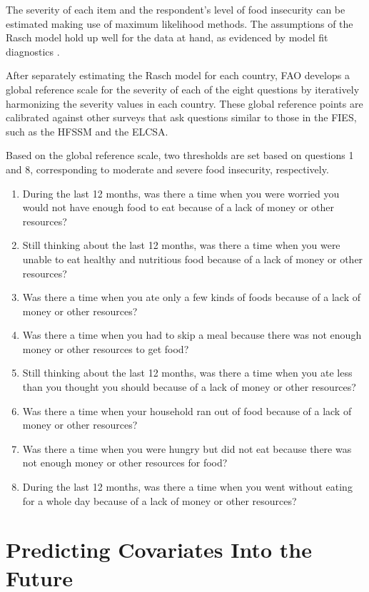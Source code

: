 \documentclass{article}
\begin{document}
The severity of each item and the respondent’s level of food insecurity can be estimated making use of maximum likelihood methods. The assumptions of the Rasch model hold up well for the data at hand, as evidenced by model fit diagnostics \cite{Cafiero2018}.

After separately estimating the Rasch model for each country, FAO develops a global reference scale for the severity of each of the eight questions by iteratively harmonizing the severity values in each country. These global reference points are calibrated against other surveys that ask questions similar to those in the FIES, such as the HFSSM and the ELCSA.

Based on the global reference scale, two thresholds are set based on questions 1 and 8, corresponding to moderate and severe food insecurity, respectively.


\begin{enumerate}
	\item During the last 12 months, was there a time when you were worried you would not have enough food to eat because of a lack of money or other resources?
	\item Still thinking about the last 12 months, was there a time when you were unable to eat healthy and nutritious food because of a lack of money or other resources?
	\item Was there a time when you ate only a few kinds of foods because of a lack of money or other resources?
	\item Was there a time when you had to skip a meal because there was not enough money or other resources to get food?
	\item Still thinking about the last 12 months, was there a time when you ate less than you thought you should because of a lack of money or other resources?
	\item Was there a time when your household ran out of food because of a lack of money or other resources?
	\item Was there a time when you were hungry but did not eat because there was not enough money or other resources for food?
	\item During the last 12 months, was there a time when you went without eating for a whole day because of a lack of money or other resources?
  \label{itm:fies}
\end{enumerate}

\section{Predicting Covariates Into the Future}
\end{document}
